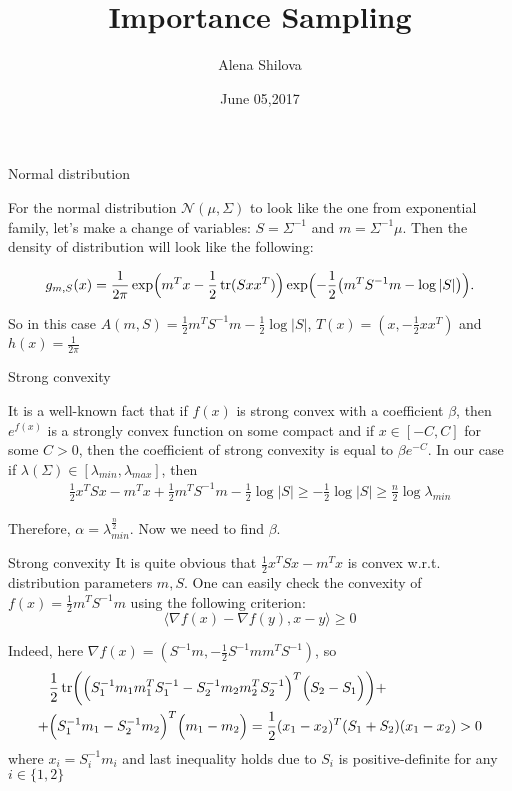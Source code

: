 \documentclass[10pt]{beamer}
\title{Importance Sampling}
\author{Alena Shilova}
\date{June 05,2017}
\institute{Skoltech}
\DeclareMathOperator{\tr}{tr}
\begin{document}
\maketitle

\begin{frame}{Normal distribution}

For the normal distribution $\mathcal{N} (\mu, \Sigma)$ to look like the one from exponential family, let's make a change of variables: $S = \Sigma^{-1}$ and $m = \Sigma^{-1} \mu$. Then the density of distribution will look like the following:

\[
g_{m,S}(x) = \frac1{2\pi} \exp \Bigl( m^T x - \frac 12 \tr( Sxx^T ) \Bigr) \exp \Bigl(- \frac 1 2 \bigl( m^TS^{-1}m - \log |S| \bigr) \Bigr).
\]

So in this case $A(m, S) = \frac 12 m^TS^{-1} m - \frac 12 \log |S|$, $T(x) = (x, -\frac 12 xx^T)$ and $h(x) = \frac 1{2\pi}$

\end{frame}

\begin{frame}{Strong convexity}

It is a well-known fact that if $f(x)$ is strong convex with a coefficient $\beta$, then $e^{f(x)}$ is a strongly convex function on some compact and if $x \in [-C, C]$ for some $C > 0$, then the coefficient of strong convexity is equal to $\beta e^{-C}$. In our case if $\lambda(\Sigma) \in [\lambda_{min}, \lambda_{max}]$, then
\begin{align*}
    \frac 12 x^T Sx - m^Tx + \frac 12 m^TS^{-1}m - \frac 12 \log|S| \geq -\frac 12 \log |S| \geq \frac n2 \log \lambda_{min}
\end{align*}

Therefore, $\alpha = \lambda_{min}^{\frac n2}$. Now we need to find $\beta$.

\end{frame}

\begin{frame}{Strong convexity}
It is quite obvious that $\frac 12 x^T Sx - m^Tx$ is convex w.r.t. distribution parameters $m, S$. One can easily check the convexity of $f(x) = \frac 12 m^TS^{-1}m$ using the following criterion:
\[
\langle \nabla f(x) - \nabla f(y), x-y \rangle \geq 0
\]

Indeed, here $\nabla f(x) = (S^{-1}m, - \frac 12 S^{-1} mm^TS^{-1})$, so 
\begin{align*}
&\frac 12 \tr \biggl( \Bigl( S_1^{-1} m_1m_1^TS_1^{-1} - S_2^{-1}m_2m_2^TS_2^{-1}\Bigr)^T\Bigl( S_2 -S_1 \Bigr) \biggr) + \\ 
+ &\Bigl( S_1^{-1} m_1 - S_2^{-1} m_2\Bigr)^T \Bigl( m_1-m_2 \Bigr)  = \frac 12 (x_1 - x_2)^T(S_1 + S_2)(x_1-x_2) > 0
\end{align*}
where $x_i = S_i^{-1}m_i$ and last inequality holds due to $S_i$ is positive-definite for any $i \in \{1,2\}$ 
 
\end{frame}
\end{document}
